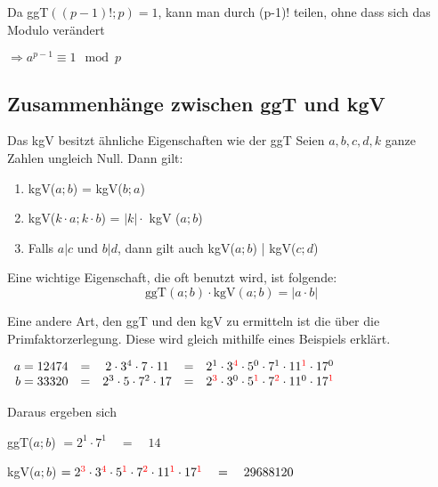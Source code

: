 \documentclass[main.tex]{subfiles}
\begin{document}
\begin{Beweis}
	Da ggT$\left ( (p-1)! ; p \right ) = 1$, kann man durch (p-1)! teilen, ohne dass sich das Modulo verändert
	
	$ \Rightarrow a^{p-1} \equiv 1 \mod p$
\end{Beweis}


\subsection{Zusammenhänge zwischen ggT und kgV}


\begin{Theorem}
	Das kgV besitzt ähnliche Eigenschaften wie der ggT
	Seien $a,b,c,d,k$ ganze Zahlen ungleich Null. Dann gilt:
	\begin{enumerate}
		\item kgV($a;b$) = kgV($b;a$)
		\item kgV($k\cdot a ; k \cdot b$) = $|k| \cdot$ kgV ($a;b$)
		\item Falls $a | c$ und $b | d$, dann gilt auch kgV($a;b$) | kgV($c;d$)
	\end{enumerate}

	Eine wichtige Eigenschaft, die oft benutzt wird, ist folgende:
	$$\text{ggT}(a;b) \cdot \text{kgV}(a;b) = |a \cdot b|$$

	Eine andere Art, den ggT und den kgV zu ermitteln ist die über die Primfaktorzerlegung. Diese wird gleich mithilfe eines Beispiels erklärt.
\end{Theorem}

\begin{Beispiel}
	$\begin{array}{rcccl}
		a = 12474 &=& 2 \cdot 3^4 \cdot 7 \cdot 11 &=& 2^1 \cdot 3^{\textcolor{red}{4}} \cdot 5^0 \cdot 7^1 \cdot 11^{\textcolor{red}{1}} \cdot 17^0 \\
		b = 33320 &=& 2^3 \cdot 5 \cdot 7^2 \cdot17 &=& 2^{\textcolor{red}{3}} \cdot 3^0 \cdot 5^{\textcolor{red}{1}} \cdot 7^{\textcolor{red}{2}} \cdot 11^0 \cdot 17^{\textcolor{red}{1}} \\
	\end{array}$
	
	Daraus ergeben sich

	ggT($a;b$) $= 2^1 \cdot 7^1 \quad = \quad 14$

	kgV($a;b$) $= 2^{\textcolor{red}{3}} \cdot 3^{\textcolor{red}{4}} \cdot 5^{\textcolor{red}{1}} \cdot 7^{\textcolor{red}{2}} \cdot 11^{\textcolor{red}{1}} \cdot 17^{\textcolor{red}{1}} \quad = \quad 29688120 $
\end{Beispiel}
\end{document}
